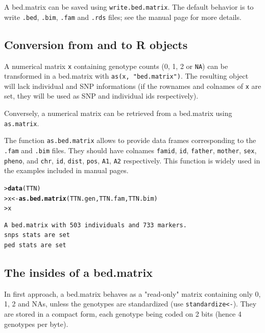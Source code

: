 \documentclass{article}\usepackage[]{graphicx}\usepackage[]{color}
\makeatletter
\newcommand{\hlstd}[1]{\textcolor[rgb]{0.345,0.345,0.345}{#1}}%
\newcommand{\hlkwb}[1]{\textcolor[rgb]{0.69,0.353,0.396}{#1}}%
\newcommand{\hlkwd}[1]{\textcolor[rgb]{0.737,0.353,0.396}{\textbf{#1}}}%
\newenvironment{kframe}{%
 \def\at@end@of@kframe{}%
 \ifinner\ifhmode%
  \def\at@end@of@kframe{\end{minipage}}%
  \begin{minipage}{\columnwidth}%
 \fi\fi%
 \def\FrameCommand##1{\hskip\@totalleftmargin \hskip-\fboxsep
 \colorbox{shadecolor}{##1}\hskip-\fboxsep
     \hskip-\linewidth \hskip-\@totalleftmargin \hskip\columnwidth}%
 \MakeFramed {\advance\hsize-\width
   \@totalleftmargin\z@ \linewidth\hsize
   \@setminipage}}%
 {\par\unskip\endMakeFramed%
 \at@end@of@kframe}
\newenvironment{knitrout}{}{} %
\makeatother
\begin{document}
  A bed.matrix can be saved using \verb!write.bed.matrix!.  
  The default behavior is to write \verb!.bed!, \verb!.bim!, \verb!.fam! 
  and \verb!.rds! files; see the manual page for more details.

\subsection{Conversion from and to R objects}

  A numerical matrix \verb!x! containing genotype counts (0, 1, 2 or \verb!NA!) can be 
  transformed in a bed.matrix with \verb!as(x, "bed.matrix")!. The resulting
  object will lack individual and SNP informations (if the rownames and colnames
  of \verb!x! are set, they will be used as SNP and individual ids respectively).

  Conversely, a numerical matrix can be retrieved from a bed.matrix using \verb!as.matrix!. 
  
  The function \verb!as.bed.matrix! allows to provide data frames corresponding to 
  the \verb!.fam! and \verb!.bim! files. They should have colnames \verb!famid!, 
  \verb!id!, \verb!father!, \verb!mother!, \verb!sex!, \verb!pheno!, and \verb!chr!, \verb!id!, 
  \verb!dist!, \verb!pos!, \verb!A1!, \verb!A2! respectively. This function is widely used in
  the examples included in manual pages.

\begin{knitrout}
\color{fgcolor}\begin{kframe}
\begin{alltt}
\hlstd{> }\hlkwd{data}\hlstd{(TTN)}
\hlstd{> }\hlstd{x} \hlkwb{<-} \hlkwd{as.bed.matrix}\hlstd{(TTN.gen, TTN.fam, TTN.bim)}
\hlstd{> }\hlstd{x}
\end{alltt}
\begin{verbatim}
A bed.matrix with 503 individuals and 733 markers.
snps stats are set
ped stats are set
\end{verbatim}
\end{kframe}
\end{knitrout}

\subsection{The insides of a bed.matrix}

  In first approach, a bed.matrix behaves as a "read-only" matrix containing only 
  0, 1, 2 and NAs, unless the genotypes are standardized (use \verb!standardize<-!).
  They are stored in a compact form, each genotype being coded on 2 bits (hence
  4 genotypes per byte). 
\end{document}
